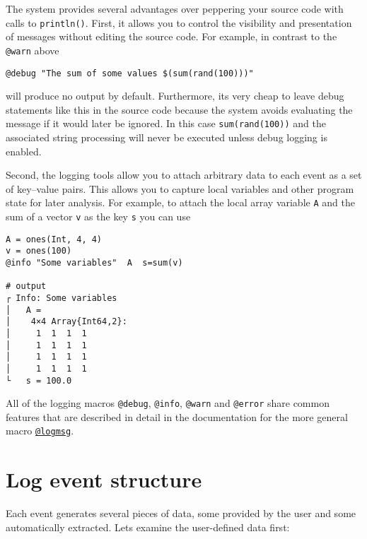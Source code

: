 The system provides several advantages over peppering your source code with calls to \texttt{println()}.  First, it allows you to control the visibility and presentation of messages without editing the source code.  For example, in contrast to the \texttt{@warn} above




\begin{verbatim}
@debug "The sum of some values $(sum(rand(100)))"
\end{verbatim}



will produce no output by default.  Furthermore, it{\textquotesingle}s very cheap to leave debug statements like this in the source code because the system avoids evaluating the message if it would later be ignored.  In this case \texttt{sum(rand(100))} and the associated string processing will never be executed unless debug logging is enabled.



Second, the logging tools allow you to attach arbitrary data to each event as a set of key–value pairs. This allows you to capture local variables and other program state for later analysis. For example, to attach the local array variable \texttt{A} and the sum of a vector \texttt{v} as the key \texttt{s} you can use




\begin{verbatim}
A = ones(Int, 4, 4)
v = ones(100)
@info "Some variables"  A  s=sum(v)

# output
┌ Info: Some variables
│   A =
│    4×4 Array{Int64,2}:
│     1  1  1  1
│     1  1  1  1
│     1  1  1  1
│     1  1  1  1
└   s = 100.0
\end{verbatim}



All of the logging macros \texttt{@debug}, \texttt{@info}, \texttt{@warn} and \texttt{@error} share common features that are described in detail in the documentation for the more general macro \hyperlink{2787319849348710857}{\texttt{@logmsg}}.



\hypertarget{8215755993541911942}{}


\section{Log event structure}



Each event generates several pieces of data, some provided by the user and some automatically extracted. Let{\textquotesingle}s examine the user-defined data first:



